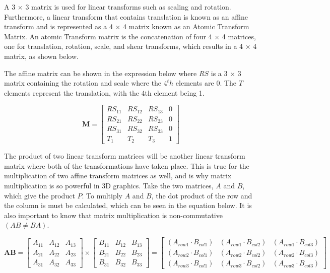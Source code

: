 \noindent
A 3 $\times$ 3 matrix is used for linear transforms such as scaling and rotation. Furthermore, a linear transform that contains translation is known as an affine transform and is represented as a 4 $\times$ 4 matrix known as an Atomic Transform Matrix. An atomic Transform matrix is the concatenation of four 4 $\times$ 4 matrices, one for translation, rotation, scale, and shear transforms, which results in a 4 $\times$ 4 matrix, as shown below. 

The affine matrix can be shown in the expression below where $RS$ is a 3 $\times$ 3 matrix containing the rotation and scale where the $4^th$ elements are 0. The $T$ elements represent the translation, with the 4th element being 1. 

\begin{equation}
\textbf{M} = \begin{bmatrix}
RS_{11} & RS_{12} & RS_{13} & 0\\
RS_{21} & RS_{22} & RS_{23} & 0\\
RS_{31} & RS_{32} & RS_{33} & 0\\
T_{1} & T_{2} & T_{3} & 1
\end{bmatrix}
\end{equation}

\noindent
The product of two linear transform matrices will be another linear transform matrix where both of the transformations have taken place. This is true for the multiplication of two affine transform matrices as well, and is why matrix multiplication is so powerful in 3D graphics. Take the two matrices, $A$ and $B$, which give the product $P$. To multiply $A$ and $B$, the dot product of the row and the column is must be calculated, which can be seen in the equation below. It is also important to know that matrix multiplication is non-commutative $(AB \not= BA)$.

\begin{equation}
\textbf{AB} = \begin{bmatrix}
A_{11} & A_{12} & A_{13}\\
A_{21} & A_{22} & A_{23}\\
A_{31} & A_{32} & A_{33}
\end{bmatrix}
\times
\begin{bmatrix}
B_{11} & B_{12} & B_{13}\\
B_{21} & B_{22} & B_{23}\\
B_{31} & B_{32} & B_{33}
\end{bmatrix}
= \begin{bmatrix}
(A_{row1} \cdot B_{col1}) & (A_{row1} \cdot B_{col2}) & (A_{row1} \cdot B_{col3})\\
(A_{row2} \cdot B_{col1}) & (A_{row2} \cdot B_{col2}) & (A_{row2} \cdot B_{col3})\\
(A_{row3} \cdot B_{col1}) & (A_{row3} \cdot B_{col2}) & (A_{row3} \cdot B_{col3})
\end{bmatrix}
\end{equation}

